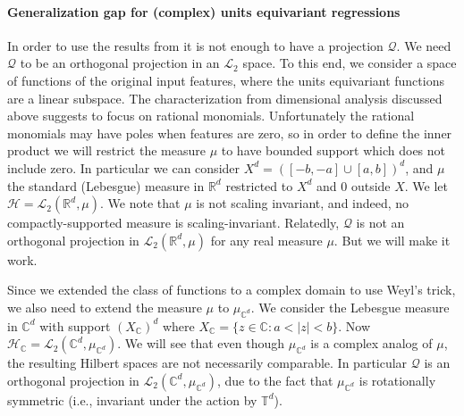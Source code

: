 \documentclass[twoside,11pt]{article}
\begin{document}
\paragraph{Generalization gap for (complex) units equivariant regressions} In order to use the results from \citet{elesedy2021provably} it is not enough to have a projection $\mathcal Q$. We need $\mathcal Q$ to be an orthogonal projection in an $\mathscr L_2$ space.
To this end, we consider a space of functions of the original input features, where the units equivariant functions are a linear subspace. The characterization from dimensional analysis discussed above suggests to focus on rational monomials. Unfortunately the rational monomials may have poles when features are zero, so in order to define the inner product we will restrict the measure $\mu$ to have bounded support which does not include zero. In particular we can consider $X^d=([-b,-a]\cup [a,b])^d$, and $\mu$ the standard (Lebesgue) measure in $\mathbb R^d$ restricted to $X^d$ and 0 outside $X$. We let $\mathcal H = \mathscr L_2( \mathbb R^d, \mu)$. We note that $\mu$ is not scaling invariant, and indeed, no compactly-supported measure is scaling-invariant. Relatedly, $\mathcal Q$ is not an orthogonal projection in $\mathscr L_2( \mathbb R^d, \mu)$ for any real measure $\mu$. But we will make it work.

Since we extended the class of functions to a complex domain to use Weyl's trick, we also need to extend the measure $\mu$ to $\mu_{\mathbb C^d}$. We consider the Lebesgue measure in $\mathbb C^d$ with support $(X_{\mathbb C})^d$ where $X_{\mathbb C}= \{z\in \mathbb C:  a<|z|<b \}$. Now $\mathcal H_{\mathbb C} = \mathscr L_2( \mathbb C^d, \mu_{\mathbb C^d})$. We will see that even though $\mu_{\mathbb C^d}$ is a complex analog of $\mu$, the resulting Hilbert spaces are not necessarily comparable. In particular $\mathcal Q$ is an orthogonal projection in $\mathscr L_2( \mathbb C^d, \mu_{\mathbb C^d})$, due to the fact that $\mu_{\mathbb C^d}$ is rotationally symmetric (i.e., invariant under the action by $\mathbb T^d$).
\end{document}
